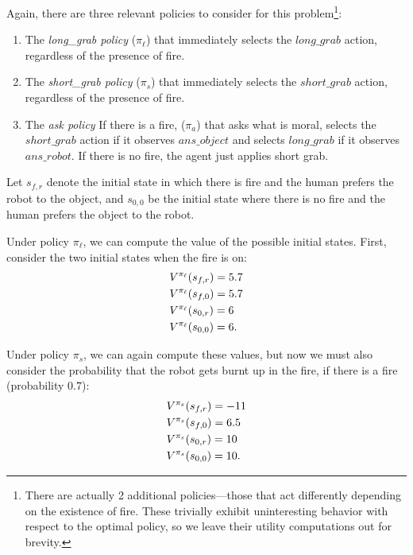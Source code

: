 \documentclass[11pt]{article}
\begin{document}
Again, there are three relevant policies to consider for this problem\footnote{There are actually 2 additional policies---those that act differently depending on the existence of fire. These trivially exhibit uninteresting behavior with respect to the optimal policy, so we leave their utility computations out for brevity.}:
\begin{enumerate}
\item The {\em long\_grab policy} ($\pi_\ell$) that immediately selects the $long\_grab$ action, regardless of the presence of fire.
\item The {\em short\_grab policy} ($\pi_s$) that immediately selects the $short\_grab$ action, regardless of the presence of fire.
\item The {\em ask policy} If there is a fire, ($\pi_a$) that asks what is moral, selects the $short\_grab$ action if it observes $ans\_object$ and selects $long\_grab$ if it observes $ans\_robot$. If there is no fire, the agent just applies short grab.
\end{enumerate}

Let $s_{f,r}$ denote the initial state in which there is fire and the human prefers the robot to the object, and $s_{0,0}$ be the initial state where there is no fire and the human prefers the object to the robot.

Under policy $\pi_\ell$, we can compute the value of the possible initial states. First, consider the two initial states when the fire is on:
\begin{align}
&V^{\pi_\ell}(s_{f,r}) = 5.7 \notag\\
&V^{\pi_\ell}(s_{f,0}) = 5.7 \notag\\
&V^{\pi_\ell}(s_{0,r}) = 6 \notag\\
&V^{\pi_\ell}(s_{0,0}) = 6.
\end{align}

Under policy $\pi_s$, we can again compute these values, but now we must also consider the probability that the robot gets burnt up in the fire, if there is a fire (probability $0.7$):
\begin{align}
&V^{\pi_s}(s_{f,r}) = -11 \notag\\
&V^{\pi_s}(s_{f,0}) = 6.5 \notag\\
&V^{\pi_s}(s_{0,r}) = 10 \notag\\
&V^{\pi_s}(s_{0,0}) = 10.
\label{eq:short-policy}
\end{align}
\end{document}
